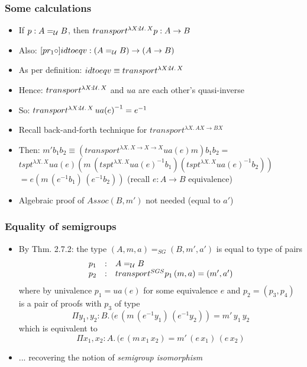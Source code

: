 \documentclass[handout]{beamer}
\newcommand{\depi}[3]{\Pi{#1{:}#2.\,#3}}
\newcommand{\lam}[2]{\lambda{#1.\,#2}}
\newcommand{\lamt}[3]{\lambda{#1{:}#2.\,#3}}
\newcommand{\UU}{{\cal U}}
\newcommand{\opp}[1]{\mathord{{#1}^{-1}}}
\begin{document}
 \frame
  {

    \frametitle{Some calculations}

    \begin{itemize}[<+->]
    \item If $p: A=_{\UU} B$, then $transport^{\lamt{X}{\UU}{X}}p : A\to B$
    \item Also: $[pr_1\circ] idtoeqv: (A=_\UU B) \to (A\to B)$
    \item As per definition: $idtoeqv\equiv transport^{\lamt{X}{\UU}{X}}$
    \item Hence: $transport^{\lamt{X}{\UU}{X}}$ and $ua$ are each other's quasi-inverse
    \item So: $transport^{\lamt{X}{\UU}{X}}\,\opp{ua(e)}= \opp{e}$
    \item Recall back-and-forth technique for $transport^{\lam{X}{AX \to BX}}$
    \item Then: $m' b_1 b_2 \equiv (transport^{\lam{X}{X{\to}X{\to}X}} ua(e) m)b_1 b_2 = {}$\\
  $tspt^{\lam{X}{X}} ua(e) (m\,(tspt^{\lam{X}{X}}\opp{ua(e)}b_1)(tspt^{\lam{X}{X}}\opp{ua(e)}b_2))$\\
  ${}= e(m\,(\opp e b_1)\,(\opp e b_2))$ (recall $e:A\to B$ equivalence)
    \item Algebraic proof of $Assoc(B,m')$ not needed (equal to $a'$)

    \end{itemize}
  }

 \frame
  {

    \frametitle{Equality of semigroups}

    \begin{itemize}[<+->]
    \item By Thm. 2.7.2: the type $(A,m,a) =_{SG} (B,m',a')$ is equal to type of pairs
\[\begin{array}{lcl}p_1&:&A=_{\UU}B\\p_2&:&transport^{SGS}p_1\,(m,a) = (m',a') \end{array}\]
where by univalence $p_1=ua(e)$ for some equivalence $e$ and $p_2=(p_3,p_4)$ is a pair of proofs
with $p_3$ of type
\[\depi{y_1,y_2}{B}{(e\,(m\,(\opp e y_1)\,(\opp e y_2))=m'\,y_1\,y_2}\]
which is equivalent to
\[\depi{x_1,x_2}{A}{(e\,(m\,x_1\,x_2)=m'\,(e\,x_1)\,(e\,x_2)}\]

    \item ... recovering the notion of \emph{semigroup isomorphism}

    \end{itemize}
  }
\end{document}
